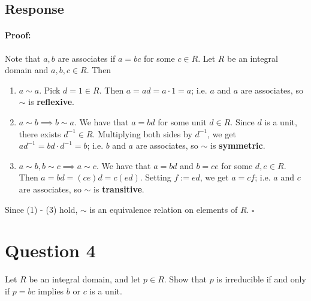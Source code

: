 \documentclass [12pt] {article}
\newenvironment{proof}{\paragraph{Proof:}}{\hfill$\square$}
\begin{document}
\subsection*{Response}
\begin{proof}
    Note that $a, b$ are associates if $a = bc$ for some $c \in R$.
    Let $R$ be an integral domain and $a, b, c \in R$. Then
    \begin{enumerate}[label=\textit{(\roman*)}]
        \item $a \sim a$. Pick $d = 1 \in R$. Then $a = ad = a \cdot 1 = a$; i.e. $a$ and
            $a$ are associates, so $\sim$ is \textbf{reflexive}.
        \item $a \sim b \implies b \sim a$. We have that $a = bd$ for some unit $d \in R$.
            Since $d$ is a unit, there exists $d^{-1} \in R$. Multiplying both sides by $d^{-1}$,
            we get $ad^{-1} = bd \cdot d^{-1} = b$; i.e. $b$ and $a$ are associates,
            so $\sim$ is \textbf{symmetric}.
        \item $a \sim b, b \sim c \implies a \sim c$. We have that $a = bd$ and $b = ce$
            for some $d, e \in R$. Then $a = bd = (ce)d = c(ed)$. Setting $f := ed$, we get
            $a = cf$; i.e. $a$ and $c$ are associates, so $\sim$ is \textbf{transitive}.
    \end{enumerate}
    Since (1) - (3) hold, $\sim$ is an equivalence relation on elements of $R$.
\end{proof}
\newpage


\section*{Question 4}
Let $R$ be an integral domain, and let $p\in R$. Show that $p$ is irreducible if and only if $p=bc$
implies $b$ or $c$ is a unit.
\end{document}
